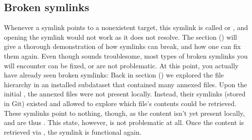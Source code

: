\subsection{Broken symlinks}
\label{\detokenize{basics/101-115-symlinks:broken-symlinks}}\label{\detokenize{basics/101-115-symlinks:wslfiles}}\label{\detokenize{basics/101-115-symlinks:index-5}}
\sphinxAtStartPar
Whenever a symlink points to a non\sphinxhyphen{}existent target, this symlink is called
 or , and opening the symlink would not work as it does not resolve. The
section {\hyperref[\detokenize{basics/101-136-filesystem:file-system}]{}} () will give a thorough demonstration of how symlinks can
break, and how one can fix them again. Even though  sounds
troublesome, most types of broken symlinks you will encounter can be fixed,
or are not problematic. At this point, you actually have already seen broken
symlinks: Back in section {\hyperref[\detokenize{basics/101-105-install:installds}]{}} () we explored
the file hierarchy in an installed subdataset that contained many annexed
 files. Upon the initial , the annexed files were not present locally.
Instead, their symlinks (stored in Git) existed and allowed to explore which
file’s contents could be retrieved. These symlinks point to nothing, though, as
the content isn’t yet present locally, and are thus . This state,
however, is not problematic at all. Once the content is retrieved via
, the symlink is functional again.

